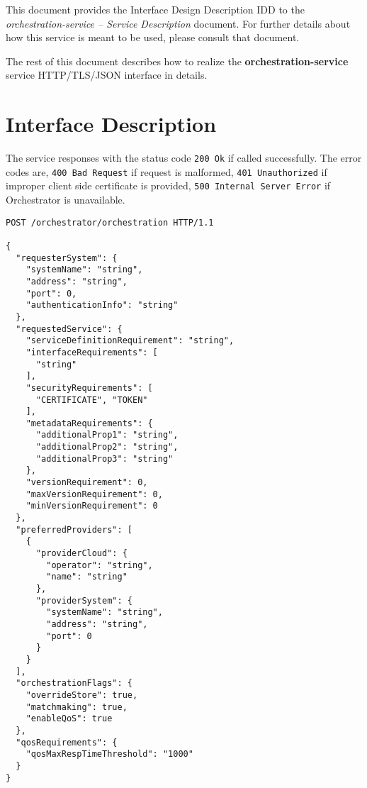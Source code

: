 \documentclass[a4paper]{arrowhead}
\newcommand{\fref}[1]{{\textcolor{ArrowheadBlue}{\hyperref[sec:functions:#1]{#1}}}}
\begin{document}
This document provides the Interface Design Description IDD to the \textit{orchestration-service -- Service Description} document.
For further details about how this service is meant to be used, please consult that document.

The rest of this document describes how to realize the \textbf{orchestration-service} service HTTP/TLS/JSON interface in details.

\newpage

\section{Interface Description}
\label{sec:functions}

The service responses with the status code \texttt{200 Ok} if called successfully. The error codes are, \texttt{400 Bad Request} if request is malformed, \texttt{401 Unauthorized} if improper client side certificate is provided, \texttt{500 Internal Server Error} if Orchestrator is unavailable.

\begin{lstlisting}[language=http,label={lst:orchestration},caption={An \fref{orchestration-service} invocation.}]
POST /orchestrator/orchestration HTTP/1.1

{
  "requesterSystem": {
    "systemName": "string",
    "address": "string",
    "port": 0,
    "authenticationInfo": "string"
  },
  "requestedService": {
    "serviceDefinitionRequirement": "string",
    "interfaceRequirements": [
      "string"
    ],
    "securityRequirements": [
      "CERTIFICATE", "TOKEN"
    ],
    "metadataRequirements": {
      "additionalProp1": "string",
      "additionalProp2": "string",
      "additionalProp3": "string"
    },
    "versionRequirement": 0,
    "maxVersionRequirement": 0,
    "minVersionRequirement": 0
  },
  "preferredProviders": [
    {
      "providerCloud": {
        "operator": "string",
        "name": "string"
      },
      "providerSystem": {
        "systemName": "string",
        "address": "string",
        "port": 0
      }
    }
  ],
  "orchestrationFlags": {
    "overrideStore": true,
    "matchmaking": true,
    "enableQoS": true
  },
  "qosRequirements": {
    "qosMaxRespTimeThreshold": "1000"
  }
}
\end{lstlisting}

\clearpage
\end{document}
